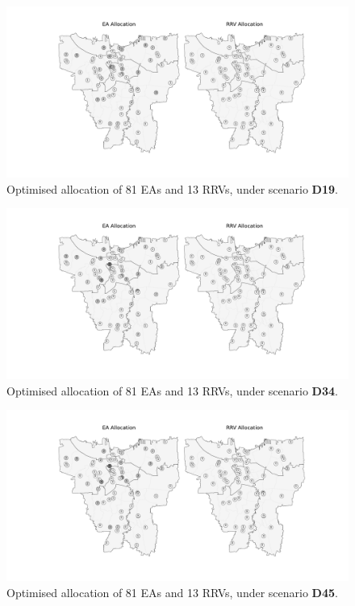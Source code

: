 \documentclass[preprint,12pt]{elsarticle}
\begin{document}
\begin{figure}
\begin{center}
\includegraphics[width=\textwidth]{img/map_optimised_19}
\caption{Optimised allocation of 81 EAs and 13 RRVs, under scenario \textbf{D19}.}
\label{fig:optimal_current_allocation_19}
\end{center}
\end{figure}

\begin{figure}
\begin{center}
\includegraphics[width=\textwidth]{img/map_optimised_34}
\caption{Optimised allocation of 81 EAs and 13 RRVs, under scenario \textbf{D34}.}
\label{fig:optimal_current_allocation_34}
\end{center}
\end{figure}

\begin{figure}
\begin{center}
\includegraphics[width=\textwidth]{img/map_optimised_45}
\caption{Optimised allocation of 81 EAs and 13 RRVs, under scenario \textbf{D45}.}
\label{fig:optimal_current_allocation_45}
\end{center}
\end{figure}
\end{document}
